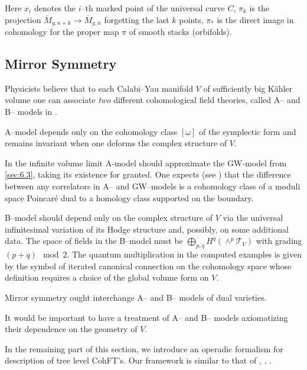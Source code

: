 \documentclass[reqno]{amsart}
\theoremstyle{definition}
\begin{document}
Here $x_i$ denotes the $i$--th marked point of the universal curve $C$,
$\pi_k$ is the projection ${\overline{M}}_{g,n+k}\to{\overline{M}}_{g,n}$
forgetting the last $k$ points, $\pi_*$ is the direct image
in cohomology for the proper map $\pi$ of smooth stacks
(orbifolds).

\medskip

\subsection{Mirror Symmetry}
Physicists believe that to each
Calabi--Yau manifold $V$ of sufficiently big K\"ahler volume
one can associate {\it two} different cohomological field
theories, called A-- and B-- models in \cite{W}.

\smallskip

A--model depends only on the cohomology class $[\omega]$ of the symplectic
form and remains invariant when one deforms the complex structure
of $V$.

\smallskip

In the infinite volume limit A-model should approximate
the GW-model from \ref{sec:6.3}, taking its existence for granted.
One expects (see \cite{BCOV}) that the difference
between any correlators in A-- and GW--models is a cohomology
class of a moduli space Poincar\'e dual to a homology class
supported on the boundary.

\smallskip

B--model should depend only on the complex structure of $V$
via the universal infinitesimal variation of its Hodge structure
and, possibly, on some additional data. The space of fields
in the B--model must be $\bigoplus_{p,q}H^q(\wedge^p\mathcal{T}_V)$
with grading $(p+q) \mod 2$. The quantum multiplication
in the computed examples is given by the symbol of iterated
canonical connection on the cohomology space whose
definition requires a choice of the global volume form on $V$.

\smallskip

Mirror symmetry ought interchange A-- and B-- models of dual
varieties.

\smallskip

It would be important to have a treatment of A-- and B-- models
axiomatizing their dependence on the geometry of $V$.

\smallskip

In the remaining part of this section, we introduce an operadic formalism
for description of tree level CohFT's. Our framework is similar to that of
\cite{V}, \cite{BG}, \cite{GiK}.
\end{document}

